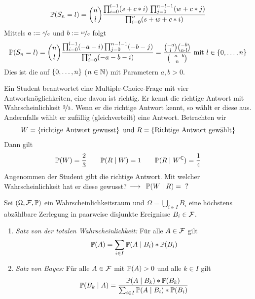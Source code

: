 \begin{beispiel}
	\begin{equation*}
		\P(S_n = l) = \binom{n}{l} \frac{\prod_{i=0}^{l-1}(s+c * i) \, \prod_{j=0}^{n-l-1}(w + c * j)}{\prod_{i=0}^n(s+w+c * i)}
	\end{equation*}
	Mittels $a \defeq \lfrac{s}{c}$ und $b \defeq \lfrac{w}{c}$ folgt
	\begin{equation*}
		\begin{aligned}
			\P(S_n = l) = \binom{n}{l} \frac{\prod_{i=0}^{l-1}(-a-i)\prod_{j=0}^{n-l-1}(-b-j)}{\prod_{i=0}^n (-a-b-i)} = \frac{\binom{-a}{l}\binom{-b}{n \cdot l}}{\binom{-a-b}{n}} \mit l \in \menge{0,\dots,n} 
		\end{aligned}
	\end{equation*}
	Dies ist die  auf $\menge{0,\dots,n}$ ($n \in \N$) mit Parametern $a,b > 0$.
\end{beispiel}

\begin{beispiel} \label{beispiel_3_1_8_multiplechoice}
	Ein Student beantwortet eine Multiple-Choice-Frage mit vier Antwortmöglichkeiten, eine davon ist richtig. Er kennt die richtige Antwort mit Wahrscheinlichkeit $\lfrac{2}{3}$. Wenn er die richtige Antwort kennt, so wählt er diese aus. Andernfalls wählt er zufällig (gleichverteilt) eine Antwort. Betrachten wir 
	\begin{equation*}
		W = \menge{\text{richtige Antwort gewusst}} \und 
		R = \menge{\text{Richtige Antwort gewählt}}
	\end{equation*}
	Dann gilt
	\begin{equation*}
		\P(W) = \frac{2}{3} \qquad \P(R \mid W) = 1 \qquad \P(R \mid W^\complement) = \frac{1}{4}
	\end{equation*}
	Angenommen der Student gibt die richtige Antwort. Mit welcher Wahrscheinlichkeit hat er diese gewusst? $\longrightarrow \enskip \P(W \mid R) = \text{ ?}$
\end{beispiel}

\begin{satz} \label{satz: 3_1_9_totaleW_bayes}
	Sei $(\Omega, \F, \P)$ ein Wahrscheinlichkeitsraum und $\Omega = \bigcup_{i \in I} B_i$ eine höchstens abzählbare Zerlegung in paarweise disjunkte Ereignisse $B_i \in \F$.
	\begin{enumerate}
		\item \textit{Satz von der totalen Wahrscheinlichkeit:} Für alle $A \in \F$ gilt
		\begin{align}
			\P(A) = \sum_{i\in I} \P(A\mid B_i) * \P(B_i) \label{eq: totaleWkeit}
		\end{align} 
		\item \textit{Satz von Bayes:} Für alle $A \in \F$ mit $\P(A) > 0$ und alle $k \in I$ gilt
		\begin{align}
			\P(B_k \mid A) = \frac{\P(A \mid B_k) * \P(B_k)}{\sum_{i\in I}\P(A\mid B_i) * \P(B_i)} \label{eq: bayes}
		\end{align}
	\end{enumerate}
\end{satz}

